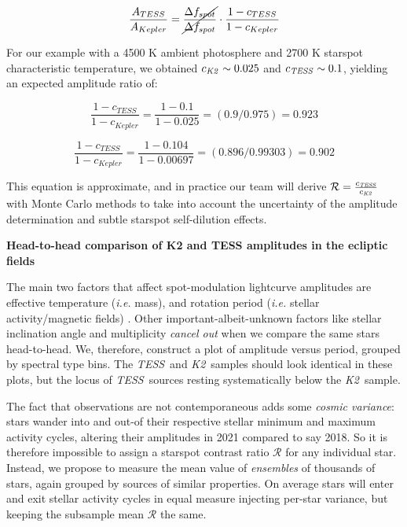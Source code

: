 \documentclass[twocolumn]{aastex631}
\newcommand{\tess}{{\it TESS}}
\newcommand{\ktwo}{{\it K2}}
\begin{document}
$$ \frac{A_{TESS}}{A_{Kepler}} = \cancel{\frac{\Delta f_{spot}}{\Delta f_{spot}}} \cdot \frac{1-c_{TESS}}{1-c_{Kepler}} $$

For our example with a 4500 K ambient photosphere and 2700 K starspot characteristic temperature, we obtained $c_{\ktwo}\sim0.025$ and $c_{\tess}\sim0.1$, yielding an expected amplitude ratio of:

$$\frac{1-c_{TESS}}{1-c_{Kepler}} = \frac{1-0.1}{1-0.025}  = (0.9/0.975)=0.923$$


$$\frac{1-c_{TESS}}{1-c_{Kepler}} = \frac{1-0.104}{1-0.00697}  = (0.896/0.99303)=0.902$$


This equation is approximate, and in practice our team will derive $\mathcal{R}= \frac{c_{\tess}}{c_{\ktwo}}$ with Monte Carlo methods to take into account the uncertainty of the amplitude determination and subtle starspot self-dilution effects.
\newline

\noindent \textbf{Head-to-head comparison of K2 and TESS amplitudes in the ecliptic fields}


The main two factors that affect spot-modulation lightcurve amplitudes are effective temperature (\emph{i.e.} mass), and rotation period (\emph{i.e.} stellar activity/magnetic fields) \cite{2014ApJS..211...24M}. Other important-albeit-unknown factors like stellar inclination angle and multiplicity \emph{cancel out} when we compare the same stars head-to-head. We, therefore, construct a plot of amplitude versus period, grouped by spectral type bins. The \tess\ and \ktwo\ samples should look identical in these plots, but the locus of \tess\ sources resting systematically below the \ktwo\ sample.


The fact that observations are not contemporaneous adds some \emph{cosmic variance}: stars wander into and out-of their respective stellar minimum and maximum activity cycles, altering their amplitudes in 2021 compared to say 2018. So it is therefore impossible to assign a starspot contrast ratio $\mathcal{R}$ for any individual star. Instead, we propose to measure the mean value of \emph{ensembles} of thousands of stars, again grouped by sources of similar properties. On average stars will enter and exit stellar activity cycles in equal measure injecting per-star variance, but keeping the subsample mean $\mathcal{R}$ the same.
\end{document}
